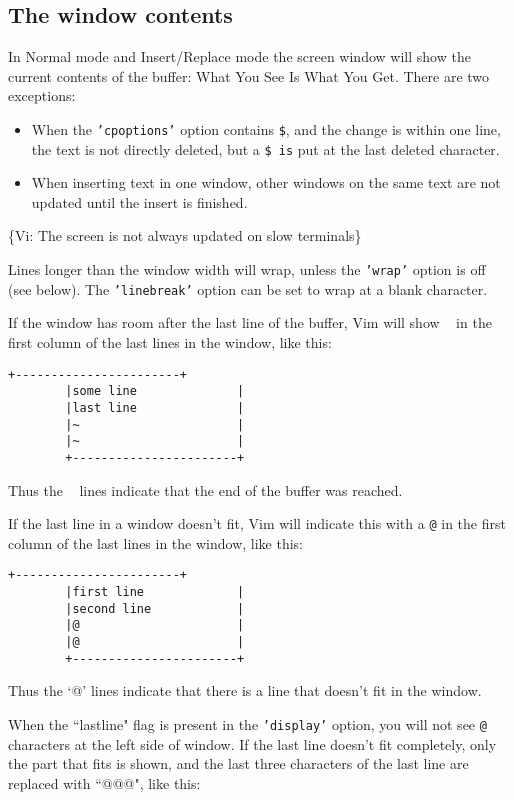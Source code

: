 \subsection{The window contents}
\label{window-contents}
In Normal mode and Insert/Replace mode the screen window will show the current contents of the buffer: What You See Is What You Get.
There are two exceptions:
\begin{itemize}
				\item When the \texttt{'cpoptions'} option contains \texttt{\$},  and the change is within one line, the text is not directly deleted, but a \texttt{\$ is} put at the last deleted character.
				\item When inserting text in one window, other windows on the same text are not updated until the insert is finished.
\end{itemize}
\{Vi: The screen is not always updated on slow terminals\}

Lines longer than the window width will wrap, unless the \texttt{'wrap'} option is off (see below).
The \texttt{'linebreak'} option can be set to wrap at a blank character.

If the window has room after the last line of the buffer, Vim will show \texttt{~} in the first column of the last lines in the window, like this:
\begin{Verbatim}[samepage=true]
		+-----------------------+
		|some line              |
		|last line              |
		|~                      |
		|~                      |
		+-----------------------+
\end{Verbatim}

Thus the \texttt{~} lines indicate that the end of the buffer was reached.

If the last line in a window doesn't fit, Vim will indicate this with a \texttt{@} in the first column of the last lines in the window, like this:

\begin{Verbatim}[samepage=true]
		+-----------------------+
		|first line             |
		|second line            |
		|@                      |
		|@                      |
		+-----------------------+
\end{Verbatim}

Thus the `@' lines indicate that there is a line that doesn't fit in the window.

When the ``lastline" flag is present in the \texttt{'display'} option, you will not see \texttt{@} characters at the left side of window.
If the last line doesn't fit completely, only the part that fits is shown, and the last three characters of the last line are replaced with ``@@@", like this:

